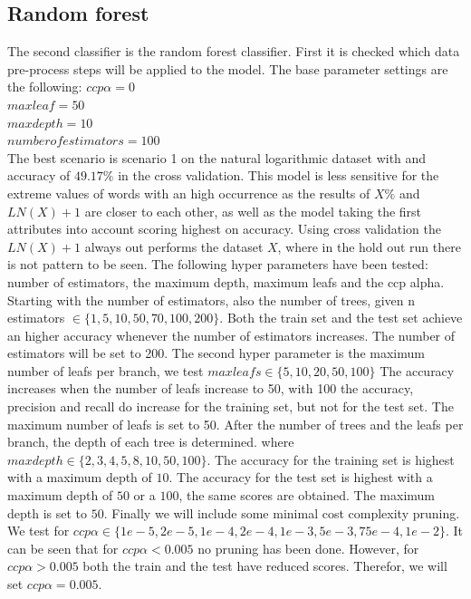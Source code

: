 \documentclass[11pt]{article}
\begin{document}
\subsection{Random forest}
The second classifier is the random forest classifier. First it is checked which data pre-process steps will be applied to the model. The base parameter settings are the following:
$ccp \alpha = 0$ \\
$max leaf = 50$ \\
$max depth = 10$ \\
$number of estimators = 100$\\
The best scenario is scenario 1 on the natural logarithmic dataset with and accuracy of $49.17\%$ in the cross validation. This model is less sensitive for the extreme values of words with an high occurrence as the results of $X\%$ and $LN(X)+1$ are closer to each other, as well as the model taking the first attributes into account scoring highest on accuracy. Using cross validation the $LN(X)+1$ always out performs the dataset $X$, where in the hold out run there is not pattern to be seen. 
\newline
The following hyper parameters have been tested: number of estimators, the maximum depth, maximum leafs and the ccp alpha. Starting with the number of estimators, also the number of trees, given n estimators $\in \{1,5,10,50,70, 100, 200\}$. 
\newline
Both the train set and the test set achieve an higher accuracy whenever the number of estimators increases. The number of estimators will be set to 200.
The second hyper parameter is the maximum number of leafs per branch, we test $max leafs \in \{5,10, 20, 50, 100\}$ The accuracy increases when the number of leafs increase to 50, with 100 the accuracy, precision and recall do increase for the training set, but not for the test set. The maximum number of leafs is set to 50.   
\newline
After the number of trees and the leafs per branch, the depth of each tree is determined. where $max depth \in \{2, 3, 4, 5, 8, 10, 50, 100\}$. The accuracy for the training set is highest with a maximum depth of $10$. The accuracy for the test set is highest with a maximum depth of $50$ or a $100$, the same scores are obtained. The maximum depth is set to $50$. 
\newline
Finally we will include some minimal cost complexity pruning. We test for $ccp  \alpha \in \{1e-5, 2e-5, 1e-4, 2e-4, 1e-3, 5e-3, 75e-4, 1e-2\}$. It can be seen that for $ccp \alpha < 0.005$ no pruning has been done. However, for $ccp \alpha > 0.005$ both the train and the test have reduced scores. Therefor, we will set $ccp \alpha=0.005$.   
\end{document}
